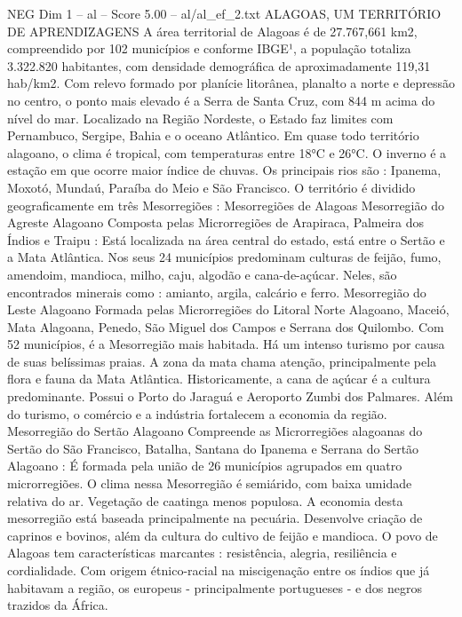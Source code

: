 \begin{textsample}{NEG Dim 1 – al – Score 5.00 – al/al\_ef\_2.txt}  \label{ex:f1_neg_138}
ALAGOAS, UM TERRITÓRIO DE APRENDIZAGENS A área territorial de Alagoas é de 27.767,661 km2, compreendido por 102 municípios e conforme IBGE¹, a população totaliza 3.322.820 habitantes, com densidade demográfica de aproximadamente 119,31 hab/km2.
Com relevo formado por planície litorânea, planalto a norte e depressão no centro, o ponto mais elevado é a Serra de Santa Cruz, com 844 m acima do nível do mar.
Localizado na Região Nordeste, o Estado faz limites com Pernambuco, Sergipe, Bahia e o oceano Atlântico.
Em quase todo território alagoano, o clima é tropical, com temperaturas entre 18{\EmojiFont °}C e 26{\EmojiFont °}C.
O inverno é a estação em que ocorre maior índice de chuvas.
Os principais rios são : Ipanema, Moxotó, Mundaú, Paraíba do Meio e São Francisco.
O território é dividido geograficamente em três Mesorregiões : Mesorregiões de Alagoas Mesorregião do Agreste Alagoano Composta pelas Microrregiões de Arapiraca, Palmeira dos Índios e Traipu : Está localizada na área central do estado, está entre o Sertão e a Mata Atlântica.
Nos seus 24 municípios predominam culturas de feijão, fumo, amendoim, mandioca, milho, caju, algodão e cana-de-açúcar.
Neles, são encontrados minerais como : amianto, argila, calcário e ferro.
Mesorregião do Leste Alagoano Formada pelas Microrregiões do Litoral Norte Alagoano, Maceió, Mata Alagoana, Penedo, São Miguel dos Campos e Serrana dos Quilombo.
Com 52 municípios, é a Mesorregião mais habitada.
Há um intenso turismo por causa de suas belíssimas praias.
A zona da mata chama atenção, principalmente pela flora e fauna da Mata Atlântica.
Historicamente, a cana de açúcar é a cultura predominante.
Possui o Porto do Jaraguá e Aeroporto Zumbi dos Palmares.
Além do turismo, o comércio e a indústria fortalecem a economia da região.
Mesorregião do Sertão Alagoano Compreende as Microrregiões alagoanas do Sertão do São Francisco, Batalha, Santana do Ipanema e Serrana do Sertão Alagoano : É formada pela união de 26 municípios agrupados em quatro microrregiões.
O clima nessa Mesorregião é semiárido, com baixa umidade relativa do ar.
Vegetação de caatinga menos populosa.
A economia desta mesorregião está baseada principalmente na pecuária.
Desenvolve criação de caprinos e bovinos, além da cultura do cultivo de feijão e mandioca.
O povo de Alagoas tem características marcantes : resistência, alegria, resiliência e cordialidade.
Com origem étnico-racial na miscigenação entre os índios que já habitavam a região, os europeus - principalmente portugueses - e dos negros trazidos da África.

\end{textsample}
